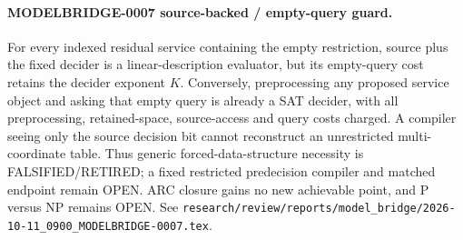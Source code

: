 \paragraph{MODELBRIDGE-0007 source-backed / empty-query guard.}
For every indexed residual service containing the empty restriction, source
plus the fixed decider is a linear-description evaluator, but its empty-query
cost retains the decider exponent $K$.  Conversely, preprocessing any proposed
service object and asking that empty query is already a SAT decider, with all
preprocessing, retained-space, source-access and query costs charged.  A
compiler seeing only the source decision bit cannot reconstruct an unrestricted
multi-coordinate table.  Thus generic forced-data-structure necessity is
FALSIFIED/RETIRED; a fixed restricted predecision compiler and matched endpoint
remain OPEN.  ARC closure gains no new achievable point, and P versus NP
remains OPEN.  See
\texttt{research/review/reports/model\_bridge/2026-10-11\_0900\_MODELBRIDGE-0007.tex}.
